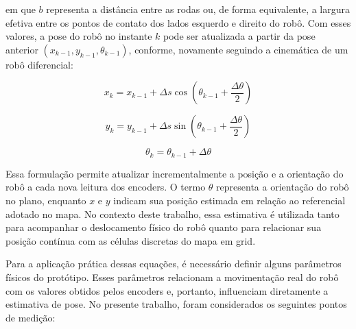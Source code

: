\documentclass[	12pt, Times, openright, twoside, a4paper, english, brazil]{abntex2}
\begin{document}
\noindent em que $b$ representa a distância entre as rodas ou, de forma equivalente, a largura efetiva entre os pontos de contato dos lados esquerdo e direito do robô. Com esses valores, a pose do robô no instante $k$ pode ser atualizada a partir da pose anterior $(x_{k-1}, y_{k-1}, \theta_{k-1})$, conforme, novamente seguindo a cinemática de um robô diferencial:

\begin{equation}
	x_k = x_{k-1} + \Delta s \cos\left(\theta_{k-1} + \frac{\Delta \theta}{2}\right)
	\label{eq:pose_x_odometria}
\end{equation}

\begin{equation}
	y_k = y_{k-1} + \Delta s \sin\left(\theta_{k-1} + \frac{\Delta \theta}{2}\right)
	\label{eq:pose_y_odometria}
\end{equation}

\begin{equation}
	\theta_k = \theta_{k-1} + \Delta \theta
	\label{eq:pose_theta_odometria}
\end{equation}

Essa formulação permite atualizar incrementalmente a posição e a orientação do robô a cada nova leitura dos encoders. O termo $\theta$ representa a orientação do robô no plano, enquanto $x$ e $y$ indicam sua posição estimada em relação ao referencial adotado no mapa. No contexto deste trabalho, essa estimativa é utilizada tanto para acompanhar o deslocamento físico do robô quanto para relacionar sua posição contínua com as células discretas do mapa em grid.

Para a aplicação prática dessas equações, é necessário definir alguns parâmetros físicos do protótipo. Esses parâmetros relacionam a movimentação real do robô com os valores obtidos pelos encoders e, portanto, influenciam diretamente a estimativa de pose. No presente trabalho, foram considerados os seguintes pontos de medição:
\end{document}
